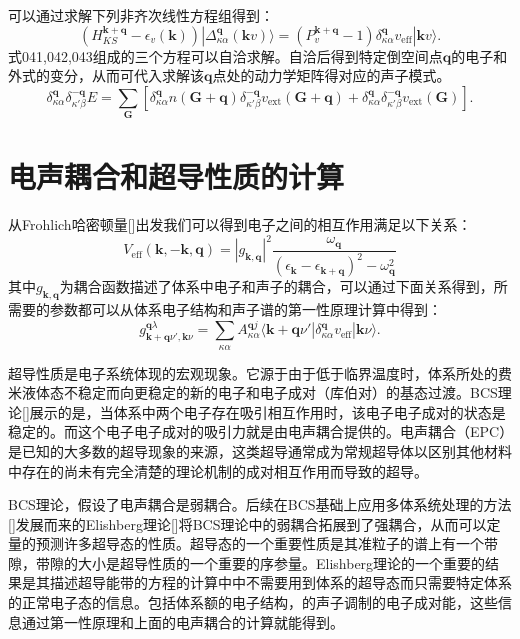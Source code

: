 \documentclass[phd,nobackinfo]{scutthesis}
\begin{document}
可以通过求解下列非齐次线性方程组得到：
\begin{equation}
  (H^{\bm{k}+\bm{q}}_{KS}-\epsilon_v(\bm{k}))|\Delta^{\bm{q}}_{\kappa\alpha}(\bm{k}v)\rangle =
  (P^{\bm{k}+\bm{q}}_v-1)\delta^{\bm{q}}_{\kappa\alpha}v_\mathrm{eff}|\bm{k}v\rangle .
\end{equation}
式041,042,043组成的三个方程可以自洽求解。自洽后得到特定倒空间点$\bm{q}$的电子和外式的变分，从而可代入求解该$\bm{q}$点处的动力学矩阵得对应的声子模式。
\begin{equation}
  \delta^{\bm{q}}_{\kappa\alpha}\delta^{-\bm{q}}_{\kappa'\beta} E =
  \sum_{\bm{G}} [ \delta^{\bm{q}}_{\kappa\alpha}n(\bm{G}+\bm{q})\delta^{\bm{-q}}_{\kappa'\beta}v_\mathrm{ext}(\bm{G}+\bm{q}) + \delta^{\bm{q}}_{\kappa\alpha}\delta^{\bm{-q}}_{\kappa'\beta} v_\mathrm{ext}(\bm{G})].
\end{equation}

\section{电声耦合和超导性质的计算}
从Frohlich哈密顿量[]出发我们可以得到电子之间的相互作用满足以下关系：
\begin{equation}
  V_{\mathrm{eff}}(\bm{k},-\bm{k},\bm{q}) = |g_{\bm{k},\bm{q}}|^2
  \frac{\omega_{\bm{q}}}{(\epsilon_{\bm{k}}-\epsilon_{\bm{k}+\bm{q}})^2-\omega^2_{\bm{q}}}
\end{equation}
其中$g_{\bm{k},\bm{q}}$为耦合函数描述了体系中电子和声子的耦合，可以通过下面关系得到，所需要的参数都可以从体系电子结构和声子谱的第一性原理计算中得到：
\begin{equation}\label{eq:coupling_coeff}
  g^{\bm{q}\lambda}_{\bm{k}+\bm{q}\nu',\bm{k}\nu} =
  \sum_{\kappa\alpha} A^{\bm{q}j}_{\kappa\alpha}
  \langle {\bm{k}+\bm{q}\nu'} | {\delta^{\bm{q}}_{\kappa\alpha}v_{\mathrm{eff}}} | {\bm{k}\nu} \rangle .
\end{equation}

超导性质是电子系统体现的宏观现象。它源于由于低于临界温度时，体系所处的费米液体态不稳定而向更稳定的新的电子和电子成对（库伯对）的基态过渡。BCS理论[]展示的是，当体系中两个电子存在吸引相互作用时，该电子电子成对的状态是稳定的。而这个电子电子成对的吸引力就是由电声耦合提供的。电声耦合（EPC）是已知的大多数的超导现象的来源，这类超导通常成为常规超导体以区别其他材料中存在的尚未有完全清楚的理论机制的成对相互作用而导致的超导。

BCS理论，假设了电声耦合是弱耦合。后续在BCS基础上应用多体系统处理的方法[]发展而来的Elishberg理论[]将BCS理论中的弱耦合拓展到了强耦合，从而可以定量的预测许多超导态的性质。超导态的一个重要性质是其准粒子的谱上有一个带隙，带隙的大小是超导性质的一个重要的序参量。Elishberg理论的一个重要的结果是其描述超导能带的方程的计算中中不需要用到体系的超导态而只需要特定体系的正常电子态的信息。包括体系额的电子结构，的声子调制的电子成对能，这些信息通过第一性原理和上面的电声耦合的计算就能得到。
\end{document}
